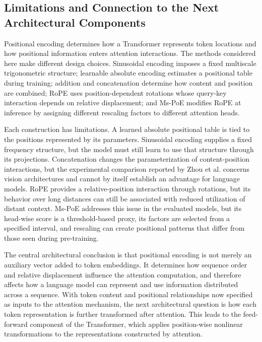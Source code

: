 \subsection{Limitations and Connection to the Next Architectural Components}
\label{subsec:pe-limitations-transition}

Positional encoding determines how a Transformer represents token
locations and how positional information enters attention interactions.
The methods considered here make different design choices. Sinusoidal
encoding imposes a fixed multiscale trigonometric structure; learnable
absolute encoding estimates a positional table during training; addition
and concatenation determine how content and position are combined;
RoPE uses position-dependent rotations whose query-key interaction
depends on relative displacement; and Ms-PoE modifies RoPE at inference
by assigning different rescaling factors to different attention heads.

Each construction has limitations. A learned absolute positional table
is tied to the positions represented by its parameters. Sinusoidal
encoding supplies a fixed frequency structure, but the model must still
learn to use that structure through its projections. Concatenation
changes the parameterization of content-position interactions, but the
experimental comparison reported by Zhou et al. concerns vision
architectures and cannot by itself establish an advantage for language
models. RoPE provides a relative-position interaction through rotations,
but its behavior over long distances can still be associated with
reduced utilization of distant context. Ms-PoE addresses this issue in
the evaluated models, but its head-wise score is a threshold-based
proxy, its factors are selected from a specified interval, and
rescaling can create positional patterns that differ from those seen
during pre-training.

The central architectural conclusion is that positional encoding is
not merely an auxiliary vector added to token embeddings. It determines
how sequence order and relative displacement influence the attention
computation, and therefore affects how a language model can represent
and use information distributed across a sequence. With token content
and positional relationships now specified as inputs to the attention
mechanism, the next architectural question is how each token
representation is further transformed after attention. This leads to
the feed-forward component of the Transformer, which applies
position-wise nonlinear transformations to the representations
constructed by attention.

